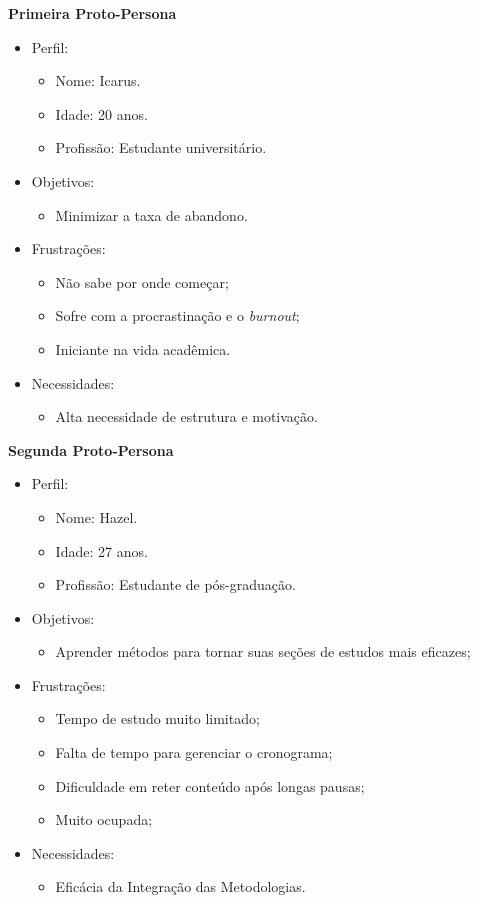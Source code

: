 \textbf{Primeira Proto-Persona}

\begin{itemize}
    \item Perfil:
    \begin{itemize}
        \item Nome: Icarus.
        \item Idade: 20 anos.
        \item Profissão: Estudante universitário.
    \end{itemize}
    \item Objetivos:
    \begin{itemize}
        \item Minimizar a taxa de abandono.
    \end{itemize}
    \item Frustrações:
    \begin{itemize}
        \item Não sabe por onde começar;
        \item Sofre com a procrastinação e o \textit{burnout};
        \item Iniciante na vida acadêmica.
    \end{itemize}
    \item Necessidades:
    \begin{itemize}
        \item Alta necessidade de estrutura e motivação.
    \end{itemize}
\end{itemize}

\textbf{Segunda Proto-Persona}

\begin{itemize}
    \item Perfil:
    \begin{itemize}
        \item Nome: Hazel.
        \item Idade: 27 anos.
        \item Profissão: Estudante de pós-graduação.
    \end{itemize}
    \item Objetivos:
    \begin{itemize}
        \item Aprender métodos para tornar suas seções de estudos mais eficazes;
    \end{itemize}
    \item Frustrações:
    \begin{itemize}
        \item Tempo de estudo muito limitado;
        \item Falta de tempo para gerenciar o cronograma;
        \item Dificuldade em reter conteúdo após longas pausas;
        \item Muito ocupada;
    \end{itemize}
    \item Necessidades:
    \begin{itemize}
        \item Eficácia da Integração das Metodologias.
    \end{itemize}
\end{itemize}

